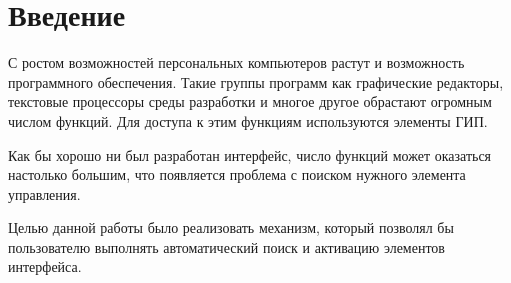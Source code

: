 \chapter*{Введение}

С ростом возможностей персональных компьютеров растут и возможность программного обеспечения. Такие группы программ как графические редакторы, текстовые процессоры среды разработки и многое другое обрастают огромным числом функций. Для доступа к этим функциям используются элементы ГИП.

Как бы хорошо ни был разработан интерфейс, число функций может оказаться настолько большим, что появляется проблема с поиском нужного элемента управления. 

Целью данной работы было реализовать механизм, который позволял бы пользователю выполнять автоматический поиск и активацию элементов интерфейса.
